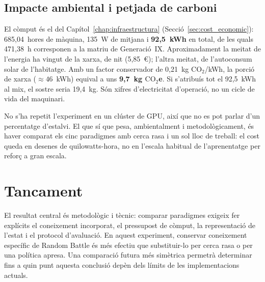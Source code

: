 \subsection{Impacte ambiental i petjada de carboni}

El còmput és el del Capítol~\ref{chap:infraestructura} (Secció~\ref{sec:cost_economic}): 685,04~hores de màquina, 135~W de mitjana i \textbf{92,5~kWh} en total, de les quals 471,38~h corresponen a la matriu de Generació~IX. Aproximadament la meitat de l'energia ha vingut de la xarxa, de nit (5,85~€); l'altra meitat, de l'autoconsum solar de l'habitatge. Amb un factor conservador de 0,21~kg $\mathrm{CO}_2$/kWh, la porció de xarxa ($\approx 46$~kWh) equival a uns \textbf{9,7~kg $\mathrm{CO}_2$e}. Si s'atribuís tot el 92,5~kWh al mix, el sostre seria 19,4~kg. Són xifres d'electricitat d'operació, no un cicle de vida del maquinari.

No s'ha repetit l'experiment en un clúster de GPU, així que no es pot parlar d'un percentatge d'estalvi. El que sí que pesa, ambientalment i metodològicament, és haver comparat els cinc paradigmes amb cerca rasa i un sol lloc de treball: el cost queda en desenes de quilowatts-hora, no en l'escala habitual de l'aprenentatge per reforç a gran escala.

\section{Tancament}

El resultat central és metodològic i tècnic: comparar paradigmes exigeix fer explícits el coneixement incorporat, el pressupost de còmput, la representació de l'estat i el protocol d'avaluació. En aquest experiment, conservar coneixement específic de Random Battle és més efectiu que substituir-lo per cerca rasa o per una política apresa. Una comparació futura més simètrica permetrà determinar fins a quin punt aquesta conclusió depèn dels límits de les implementacions actuals.
